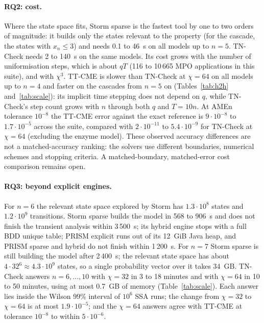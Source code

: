 \documentclass[11pt]{article}
\begin{document}
\begin{table}[t]
\centering\small
\resizebox{\textwidth}{!}{}
\caption{Wall time (s), peak memory (GB) and absolute error against the reference.
TO: timeout. For $n=6$ the TT error column is empty because no exact reference exists;
see Table~\ref{tab:scale}.}
\label{tab:h2h}
\end{table}

\paragraph{RQ2: cost.} Where the state space fits, Storm sparse is the fastest tool by one
to two orders of magnitude: it builds only the states relevant to the property (for the
cascade, the states with $x_n\le3$) and needs 0.1 to 46~s on all models up to $n=5$.
TN-Check needs 2 to 140~s on the same models. Its cost grows with the number of
uniformisation steps, which is about $qT$ (116 to 10\,665 MPO applications in this suite),
and with $\chi^3$. TT-CME is slower than TN-Check at $\chi=64$ on all models up to $n=4$ and
faster on the cascades from $n=5$ on (Tables~\ref{tab:h2h} and~\ref{tab:scale}): its implicit time
stepping does not depend on $q$, while TN-Check's step count grows with $n$ through both
$q$ and $T=10n$. At AMEn tolerance $10^{-8}$ the TT-CME error against the exact reference is
$9\cdot10^{-8}$ to $1.7\cdot10^{-5}$ across the suite, compared with $2\cdot10^{-11}$ to
$5.4\cdot10^{-9}$ for TN-Check at $\chi=64$ (excluding the enzyme model). These observed accuracy differences are not a matched-accuracy ranking:
the solvers use different boundaries, numerical schemes and stopping criteria.
A matched-boundary, matched-error cost comparison remains open.

\paragraph{RQ3: beyond explicit engines.} For $n=6$ the relevant state space explored by
Storm has $1.3\cdot10^8$ states and $1.2\cdot10^9$ transitions. Storm sparse builds the model
in 568 to 906~s and does not finish the transient analysis within 3\,500~s; its hybrid
engine stops with a full BDD unique table; PRISM explicit runs out of its 12~GiB Java heap,
and PRISM sparse and hybrid do not finish within 1\,200~s. For $n=7$ Storm sparse is still
building the model after 2\,400~s; the relevant state space has about $4\cdot32^6\approx
4.3\cdot10^9$ states, so a single probability vector over it takes 34~GB. TN-Check answers
$n=6,\dots,10$ with $\chi=32$ in 3 to 18 minutes and with $\chi=64$ in 10 to 50 minutes,
using at most 0.7~GB of memory (Table~\ref{tab:scale}). Each answer lies inside the Wilson
99\% interval of $10^6$ SSA runs; the change from $\chi=32$ to $\chi=64$ is at most
$1.9\cdot10^{-5}$; and the $\chi=64$ answers agree with TT-CME at tolerance $10^{-8}$ to within
$5\cdot10^{-6}$.
\end{document}
